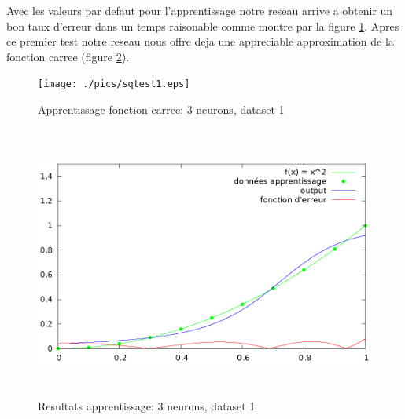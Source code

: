 \documentclass[twoside,openright,a4paper,11pt,french]{article}
\begin{document}
Avec les valeurs par defaut pour l'apprentissage notre reseau arrive a obtenir
un bon taux d'erreur dans un temps raisonable comme montre par la figure
\ref{fig:sqtest1}. Apres ce premier test notre reseau nous offre deja une
appreciable approximation de la fonction carree (figure \ref{fig:chartsqtest1}).

\begin{figure}[h]
\centering
\texttt{[image: ./pics/sqtest1.eps]}
\caption{Apprentissage fonction carree: 3 neurons, dataset 1}
\label{fig:sqtest1}
\end{figure}

\begin{figure}[h]
\centering
\includegraphics[width=12cm,height=9cm]{./pics/chartsqtest1.eps}
\caption{Resultats apprentissage: 3 neurons, dataset 1}
\label{fig:chartsqtest1}
\end{figure}



\clearpage
{}


\end{document}
